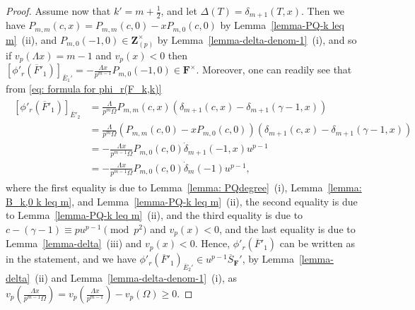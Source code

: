 \documentclass[11pt]{amsart}
\theoremstyle{definition}
\numberwithin{equation}{subsection}
\theoremstyle{plain}
\theoremstyle{plain}
\theoremstyle{plain}
\theoremstyle{plain}
\theoremstyle{plain}
\theoremstyle{plain}
\theoremstyle{plain}
\theoremstyle{plain}
\theoremstyle{plain}
\theoremstyle{plain}
\theoremstyle{plain}
\theoremstyle{plain}
\theoremstyle{definition}
\theoremstyle{definition}
\theoremstyle{definition}
\theoremstyle{remark}
\renewcommand{\(}{\textup{(}}
\renewcommand{\)}{\textup{)}}
\newcommand{\Z}{\mathbf{Z}}
\newcommand{\F}{\mathbf{F}}
\newcommand{\barS}{\overline{S}}
\newcommand{\barE}{\overline{E}}
\newcommand{\barF}{\overline{F}}
\begin{document}
\begin{proof}
Assume now that $k'=m+\frac{1}{2}$, and let $\Delta(T)=\delta_{m+1}(T,x)$. Then we have $P_{m,m}(c,x)=P_{m,m}(c,0)-xP_{m,0}(c,0)$ by Lemma~\ref{lemma-PQ-k leq m}~(ii), and $P_{m,0}(-1,0)\in\Z_{(p)}^{\times}$ by Lemma~\ref{lemma-delta-denom-1}~(i), and so if $v_p(\Lambda x)=m-1$ and $v_p(x)<0$ then $[\phi'_r(\barF'_1)]_{\barE_1'}=-\frac{\Lambda x}{p^{m-1}}P_{m,0}(-1,0)\in\F^{\times}$. Moreover, one can readily see that from \eqref{eq: formula for phi_r(F_k,k)}
\begin{align}\label{eq: case k=m r=2m strong div, 2}
\begin{split}
[\phi'_r(\barF'_1)]_{\barE'_2}&=\frac{\Lambda}{p^{m}\Omega} P_{m,m}(c,x)\left(\delta_{m+1}(c,x)-\delta_{m+1}(\gamma-1,x)\right)\\ &= \frac{\Lambda}{p^{m}\Omega} (P_{m,m}(c,0)-xP_{m,0}(c,0))\left(\delta_{m+1}(c,x)-\delta_{m+1}(\gamma-1,x)\right)\\
&=-\frac{\Lambda x}{p^{m-1}\Omega} P_{m,0}(c,0)\dot{\delta}_{m+1}(-1,x)u^{p-1}\\
&=-\frac{\Lambda x}{p^{m-1}\Omega} P_{m,0}(c,0)\dot{\delta}_{m}(-1)u^{p-1},
\end{split}
\end{align}
where the first equality is due to Lemma~\ref{lemma: PQdegree}~(i), Lemma~\ref{lemma: B_k,0 k leq m}, and Lemma~\ref{lemma-PQ-k leq m}~(ii), the second equality is due to Lemma~\ref{lemma-PQ-k leq m}~(ii), and the third equality is due to $c-(\gamma-1)\equiv pu^{p-1}\pmod{p^2}$ and $v_p(x)<0$, and the last equality is due to Lemma~\ref{lemma-delta}~(iii) and $v_p(x)<0$. Hence, $\phi'_r(\barF'_1)$ can be written as in the statement, and we have $\phi'_r(\barF'_1)_{\barE_2'}\in u^{p-1}\barS_\F'$, by Lemma~\ref{lemma-delta}~(ii) and Lemma~\ref{lemma-delta-denom-1}~(i), as $v_p(\frac{\Lambda x}{p^{m-1}\Omega})= v_p(\frac{\Lambda x}{p^{m-1}})-v_p(\Omega)\geq 0$.



\end{proof}
\end{document}
